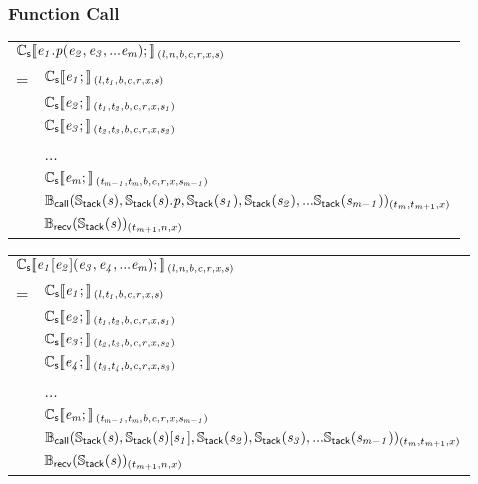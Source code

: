 \documentclass[a4j]{jsarticle}
\newcommand{\lb}{[\![}				%
\newcommand{\rb}{]\!]}				%
\newcommand{\db}[1]{\lb#1\rb}			%
\newcommand{\den}[2]{{#1}\db{#2}\,}
\newcommand{\defC}[3]{\den{#1}{\sf #2}_{\it #3}}
\newcommand{\Cs}{\defC{\mathbb{C}_{\sf s}}}
\newcommand{\Stack}[1]{\mathbb{S}_{\sf tack}(#1)}
\newcommand{\defB}[3]{{#1}({\sf #2})_{#3}}
\newcommand{\Bcall}{\defB{\mathbb{B}_{\sf call}}}
\newcommand{\Brecv}{\defB{\mathbb{B}_{\sf recv}}}
\newcommand{\var}[1]{{\it #1}}
\begin{document}
\subsubsection{Function Call}

\begin{tabular}{ll}
	\multicolumn{2}{l}{
		$ \Cs{ \var{e_1}.\var{p} ( \var{e_2}, \var{e_3}, ... \var{e_m} ); }{(l, n, b, c, r, x, s)} $
	}  \\
	=  &  $ \Cs{ \var{e_1}; }{(l  , t_1, b, c, r, x, s)}      $  \\
	   &  $ \Cs{ \var{e_2}; }{(t_1, t_2, b, c, r, x, s_1)}    $  \\
	   &  $ \Cs{ \var{e_3}; }{(t_2, t_3, b, c, r, x, s_2)}    $  \\
	   &  ...  \\
	   &  $ \Cs{ \var{e_m}; }{(t_{m-1}, t_m, b, c, r, x, s_{m-1})}    $  \\
	   &  $ \Bcall{ \Stack{\var{s}}, \Stack{\var{s}}.\var{p}, \Stack{\var{s_1}}, \Stack{\var{s_2}}, ... \Stack{\var{s_{m-1}}} }{(t_m, t_{m+1}, x)}    $  \\
	   &  $ \Brecv{ \Stack{\var{s}} }{(t_{m+1}, n, x)}    $  \\
\end{tabular}

\vspace{1em}

\begin{tabular}{ll}
	\multicolumn{2}{l}{
		$ \Cs{ \var{e_1}[\var{e_2}] ( \var{e_3}, \var{e_4}, ... \var{e_m} ); }{(l, n, b, c, r, x, s)} $
	}  \\
	=  &  $ \Cs{ \var{e_1}; }{(l  , t_1, b, c, r, x, s)}      $  \\
	   &  $ \Cs{ \var{e_2}; }{(t_1, t_2, b, c, r, x, s_1)}    $  \\
	   &  $ \Cs{ \var{e_3}; }{(t_2, t_3, b, c, r, x, s_2)}    $  \\
	   &  $ \Cs{ \var{e_4}; }{(t_3, t_4, b, c, r, x, s_3)}    $  \\
	   &  ...  \\
	   &  $ \Cs{ \var{e_m}; }{(t_{m-1}, t_m, b, c, r, x, s_{m-1})}    $  \\
	   &  $ \Bcall{ \Stack{\var{s}}, \Stack{\var{s}}[\var{s_1}], \Stack{\var{s_2}}, \Stack{\var{s_3}}, ... \Stack{\var{s_{m-1}}} }{(t_m, t_{m+1}, x)}    $  \\
	   &  $ \Brecv{ \Stack{\var{s}} }{(t_{m+1}, n, x)}    $  \\
\end{tabular}
\end{document}
